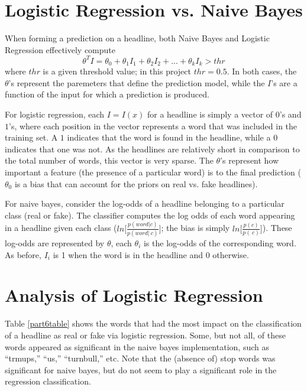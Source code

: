 \documentclass{article}
\begin{document}
   \section{Logistic Regression vs. Naive Bayes}
   When forming a prediction on a headline, both Naive Bayes and Logistic Regression effectively compute
   \begin{equation*}
      \theta^T I = \theta_0 + \theta_1 I_1 + \theta_2 I_2 + ... + \theta_k I_k > thr
   \end{equation*}
   where $thr$ is a given threshold value; in this project $thr = 0.5$. In both cases, the $\theta$'s represent
   the paremeters that define the prediction model, while the $I$'s are a function of the input for which a
   prediction is produced.

   For logistic regression, each $I = I(x)$ for a headline is simply a vector of $0$'s and $1$'s, where each
   position in the vector represents a word that was included in the training set. A $1$ indicates that the
   word is found in the headline, while a $0$ indicates that one was not. As the headlines are relatively short
   in comparison to the total number of words, this vector is very sparse. The $\theta$'s represent how important
   a feature (the presence of a particular word) is to the final prediction ($\theta_0$ is a bias that can
   account for the priors on real vs. fake headlines).

   For naive bayes, consider the log-odds of a headline belonging to a particular class (real or fake). The
   classifier computes the log odds of each word appearing in a headline given each class
   ($ln \big[ \frac{p(word | c)}{p(word | ~c)} \big]$; the bias is simply $ln \big[ \frac{p(c)}{p(~c)}\big]$).
   These log-odds are represented by $\theta$, each $\theta_i$ is the log-odds of the corresponding word.
   As before, $I_i$ is 1 when the word is in the headline and 0 otherwise.



   \section{Analysis of Logistic Regression}
   Table \ref{part6table} shows the words that had the most impact on the classification of a headline
   as real or fake via logistic regression. Some, but not all, of these words appeared as significant
   in the naive bayes implementation, such as ``trmups,'' ``us,'' ``turnbull,'' etc. Note that the (absence
   of) stop words was significant for naive bayes, but do not seem to play a significant role in
   the regression classification.
\end{document}
